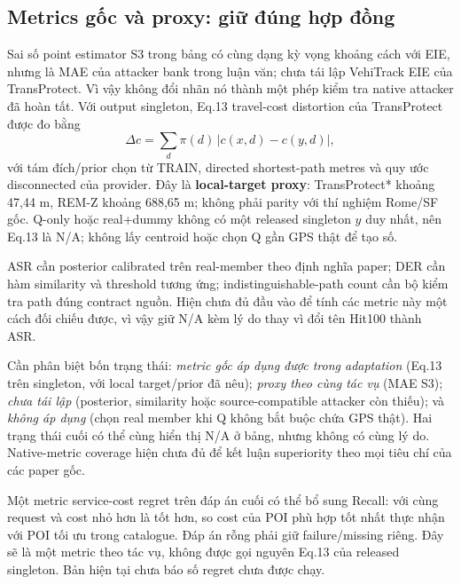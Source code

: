 \subsection{Metrics gốc và proxy: giữ đúng hợp đồng}

Sai số point estimator S3 trong bảng có cùng dạng kỳ vọng khoảng cách với EIE, nhưng là MAE
của attacker bank trong luận văn; chưa tái lập VehiTrack EIE của TransProtect. Vì vậy không đổi
nhãn nó thành một phép kiểm tra native attacker đã hoàn tất. Với output singleton,
Eq.13 travel-cost distortion của TransProtect được đo bằng
\[
\Delta c=\sum_{d}\pi(d)\,|c(x,d)-c(y,d)|,
\]
với tám đích/prior chọn từ TRAIN, directed shortest-path metres và quy ước disconnected của provider.
Đây là \textbf{local-target proxy}: TransProtect* khoảng 47,44 m, REM-Z khoảng 688,65 m; không phải parity
với thí nghiệm Rome/SF gốc. Q-only hoặc real+dummy không có một released singleton $y$ duy nhất,
nên Eq.13 là N/A; không lấy centroid hoặc chọn Q gần GPS thật để tạo số.

ASR cần posterior calibrated trên real-member theo định nghĩa paper; DER cần hàm similarity và threshold
tương ứng; indistinguishable-path count cần bộ kiểm tra path đúng contract nguồn. Hiện chưa đủ đầu vào
để tính các metric này một cách đối chiếu được, vì vậy giữ N/A kèm lý do thay vì đổi tên Hit100 thành ASR.

Cần phân biệt bốn trạng thái: \emph{metric gốc áp dụng được trong adaptation} (Eq.13 trên singleton,
với local target/prior đã nêu); \emph{proxy theo cùng tác vụ} (MAE S3); \emph{chưa tái lập} (posterior,
similarity hoặc source-compatible attacker còn thiếu); và \emph{không áp dụng} (chọn real member khi
Q không bắt buộc chứa GPS thật). Hai trạng thái cuối có thể cùng hiển thị N/A ở bảng, nhưng không
có cùng lý do. Native-metric coverage hiện chưa đủ để kết luận superiority theo mọi tiêu chí của
các paper gốc.

Một metric service-cost regret trên đáp án cuối có thể bổ sung Recall: với cùng request và cost
nhỏ hơn là tốt hơn, so cost của POI phù hợp tốt nhất thực nhận với POI tối ưu trong catalogue.
Đáp án rỗng phải giữ failure/missing riêng. Đây sẽ là một metric theo tác vụ, không được gọi nguyên
Eq.13 của released singleton. Bản hiện tại chưa báo số regret chưa được chạy.
